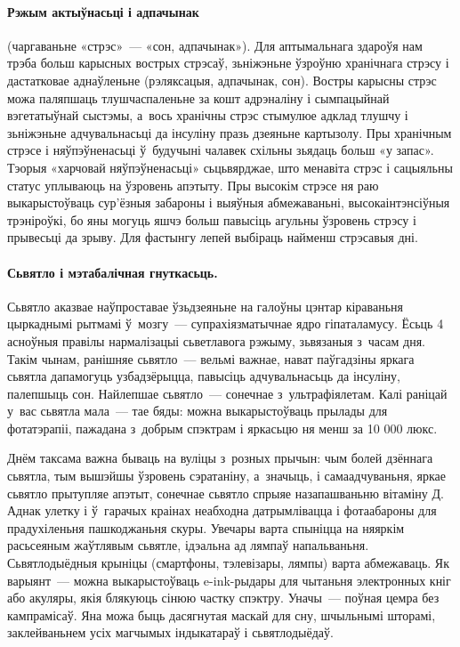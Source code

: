 \paragraph{Рэжым актыўнасьці і адпачынак} (чаргаваньне «стрэс»~--- «сон, адпачынак»).
Для аптымальнага здароўя нам трэба больш карысных вострых стрэсаў, зьніжэньне ўзроўню хранічнага стрэсу і дастатковае аднаўленьне (рэляксацыя, адпачынак, сон). Востры карысны стрэс можа паляпшаць тлушчаспаленьне за кошт адрэналіну і сымпацыйнай вэгетатыўнай сыстэмы, а~вось хранічны стрэс стымулюе адклад тлушчу і зьніжэньне адчувальнасьці да інсуліну празь дзеяньне картызолу. Пры хранічным стрэсе і няўпэўненасьці ў~будучыні чалавек схільны зьядаць больш «у запас». Тэорыя «харчовай няўпэўненасьці» сьцьвярджае, што менавіта стрэс і сацыяльны статус уплываюць на ўзровень апэтыту. Пры высокім стрэсе ня раю выкарыстоўваць сур'ёзныя забароны і выяўныя абмежаваньні, высокаінтэнсіўныя трэніроўкі, бо яны могуць яшчэ больш павысіць агульны ўзровень стрэсу і прывесьці да зрыву. Для фастынгу лепей выбіраць найменш стрэсавыя дні.

\paragraph{Сьвятло і мэтабалічная гнуткасьць.}
Сьвятло аказвае наўпроставае ўзьдзеяньне на галоўны цэнтар кіраваньня цыркаднымі рытмамі ў~мозгу~--- супрахіязматычнае ядро гіпаталамусу. Ёсьць 4 асноўныя правілы нармалізацыі сьветлавога рэжыму, зьвязаныя з~часам дня. Такім чынам, ранішняе сьвятло~--- вельмі важнае, нават паўгадзіны яркага сьвятла дапамогуць узбадзёрыцца, павысіць адчувальнасьць да інсуліну, палепшыць сон. Найлепшае сьвятло~--- сонечнае з~ультрафіялетам. Калі раніцай у~вас сьвятла мала~--- тае бяды: можна выкарыстоўваць прылады для фотатэрапіі, пажадана з~добрым спэктрам і яркасьцю ня менш за 10 000 люкс.

Днём таксама важна бываць на вуліцы з~розных прычын: чым болей дзённага сьвятла, тым вышэйшы ўзровень сэратаніну, а~значыць, і самаадчуваньня, яркае сьвятло прытупляе апэтыт, сонечнае сьвятло спрыяе назапашваньню вітаміну Д. Аднак улетку і ў~гарачых краінах неабходна датрымлівацца і фотаабароны для прадухіленьня пашкоджаньня скуры. Увечары варта спыніцца на няяркім расьсеяным жаўтлявым сьвятле, ідэальна ад лямпаў напальваньня. Сьвятлодыёдныя крыніцы (смартфоны, тэлевізары, лямпы) варта абмежаваць. Як варыянт~--- можна выкарыстоўваць e-ink-рыдары для чытаньня электронных кніг або акуляры, якія блякуюць сінюю частку спэктру. Уначы~--- поўная цемра без кампрамісаў. Яна можа быць дасягнутая маскай для сну, шчыльнымі шторамі, заклейваньнем усіх магчымых індыкатараў і сьвятлодыёдаў.

